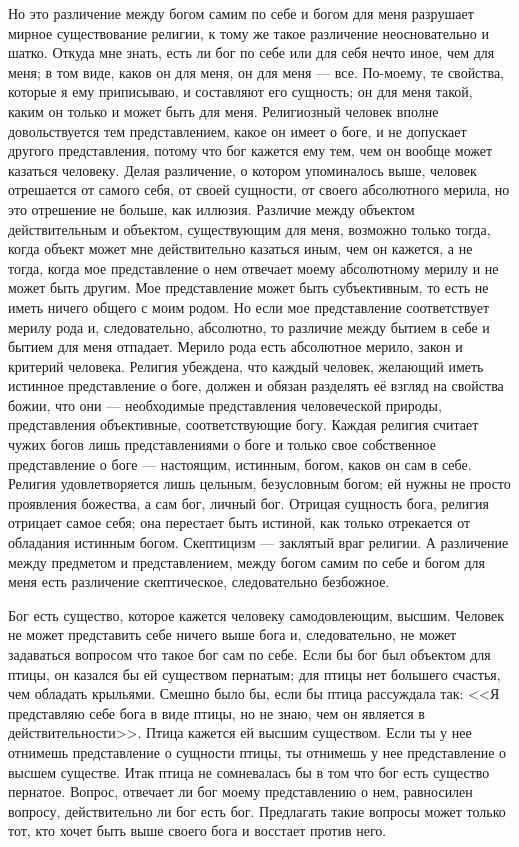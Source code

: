 \documentclass[12pt,oneside]{book}
\begin{document}
Но это различение между богом самим по себе и богом для меня разрушает мирное существование религии, к тому же такое различение неосновательно и шатко. Откуда мне знать, есть ли бог по себе или для себя нечто иное, чем для меня; в том виде, каков он для меня, он для меня --- все. По-моему, те свойства, которые я ему приписываю, и составляют его сущность; он для меня такой, каким он только и может быть для меня. Религиозный человек вполне довольствуется тем представлением, какое он имеет о боге, и не допускает другого представления, потому что бог кажется ему тем, чем он вообще может казаться человеку. Делая различение, о котором упоминалось выше, человек отрешается от самого себя, от своей сущности, от своего абсолютного мерила, но это отрешение не больше, как иллюзия. Различие между объектом действительным и объектом, существующим для меня, возможно только тогда, когда объект может мне действительно казаться иным, чем он кажется, а не тогда, когда мое представление о нем отвечает моему абсолютному мерилу и не может быть другим. Мое представление может быть субъективным, то есть не иметь ничего общего с моим родом. Но если мое представление соответствует мерилу рода и, следовательно, абсолютно, то различие между бытием в себе и бытием для меня отпадает. Мерило рода есть абсолютное мерило, закон и критерий человека. Религия убеждена, что каждый человек, желающий иметь истинное представление о боге, должен и обязан разделять её взгляд на свойства божии, что они --- необходимые представления человеческой природы, представления объективные, соответствующие богу. Каждая религия считает чужих богов лишь представлениями о боге и только свое собственное представление о боге --- настоящим, истинным, богом, каков он сам в себе. Религия удовлетворяется лишь цельным, безусловным богом; ей нужны не просто проявления божества, а сам бог, личный бог. Отрицая сущность бога, религия отрицает самое себя; она перестает быть истиной, как только отрекается от обладания истинным богом. Скептицизм --- заклятый враг религии. А различение между предметом и представлением, между богом самим по себе и богом для меня есть различение скептическое, следовательно безбожное.

Бог есть существо, которое кажется человеку самодовлеющим, высшим. Человек не может представить себе ничего выше бога и, следовательно, не может задаваться вопросом что такое бог сам по себе. Если бы бог был объектом для птицы, он казался бы ей существом пернатым; для птицы нет большего счастья, чем обладать крыльями. Смешно было бы, если бы птица рассуждала так: <<Я представляю себе бога в виде птицы, но не знаю, чем он является в действительности>>. Птица кажется ей высшим существом. Если ты у нее отнимешь представление о сущности птицы, ты отнимешь у нее представление о высшем существе. Итак птица не сомневалась бы в том что бог есть существо пернатое. Вопрос, отвечает ли бог моему представлению о нем, равносилен вопросу, действительно ли бог есть бог. Предлагать такие вопросы может только тот, кто хочет быть выше своего бога и восстает против него.
\end{document}
